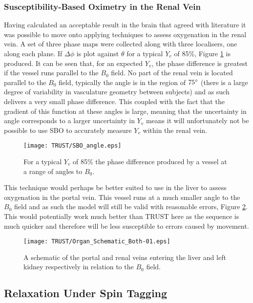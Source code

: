 \subsubsection{Susceptibility-Based Oximetry in the Renal Vein}
Having calculated an acceptable result in the brain that agreed with literature it was possible to move onto applying techniques to assess oxygenation in the renal vein. A set of three phase maps were collected along with three localisers, one along each plane. If $\Delta \phi$ is plot against $\theta$ for a typical $Y_v$ of 85\%, Figure \ref{fig:SBO_kidney} is produced. It can be seen that, for an expected $Y_v$, the phase difference is greatest if the vessel runs parallel to the $B_0$ field. No part of the renal vein is located parallel to the $B_0$ field, typically the angle is in the region of $75\degree$ (there is a large degree of variability in vasculature geometry between subjects) and as such delivers a very small phase difference. This coupled with the fact that the gradient of this function at these angles is large, meaning that the uncertainty in angle corresponds to a larger uncertainty in $Y_v$ means it will unfortunately not be possible to use \ac{SBO} to accurately measure $Y_v$ within the renal vein.

\begin{figure}[H]
	\centering
	\texttt{[image: TRUST/SBO\_angle.eps]}
	\caption{For a typical $Y_v$ of 85\% the phase difference produced by a vessel at a range of angles to $B_0$.}
	\label{fig:SBO_kidney}	
\end{figure}
This technique would perhaps be better suited to use in the liver to assess oxygenation in the portal vein. This vessel runs at a much smaller angle to the $B_0$ field and as such the model will still be valid with reasonable errors, Figure \ref{fig:PV}. This would potentially work much better than \ac{TRUST} here as the sequence is much quicker and therefore will be less susceptible to errors caused by movement.

\begin{figure}[H]
	\centering
	\texttt{[image: TRUST/Organ\_Schematic\_Both-01.eps]}
	\caption{A schematic of the portal and renal veins entering the liver and left kidney respectively in relation to the $B_0$ field.}
	\label{fig:PV}	
\end{figure}

\subsection{\ttwo Relaxation Under Spin Tagging}
